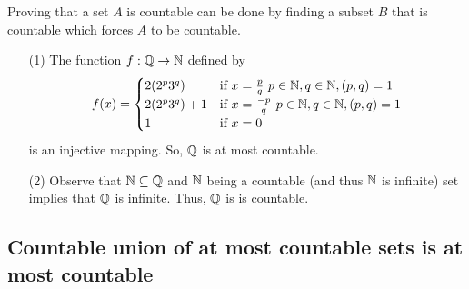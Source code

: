 \documentclass[a4paper]{report}
\begin{document}
Proving that a set \( A  \) is countable can be done by finding a subset \( B  \) that is countable which forces \( A  \) to be countable. 

\begin{eg}[\( \Q  \) is countable]
   \begin{enumerate}
       \item[(1)] The function \( f: \mathbb{Q} \to \mathbb{N} \) defined by 
           \[  f(x) = 
           \begin{cases}
               2(2^{p} 3^{q}) &\text{if} \ x = \frac{ p }{ q } \ p \in \mathbb{N}, q \in \mathbb{N}, (p,q) = 1 \\
               2(2^{p} 3^{q}) + 1 &\text{if} \ x = \frac{ -p }{ q } \ p \in \mathbb{N}, q \in \mathbb{N}, (p,q) = 1 \\
               1 &\text{if} \ x = 0
           \end{cases} \]
           is an injective mapping. So, \( \Q  \) is at most countable.
        \item[(2)] Observe that \( \mathbb{N} \subseteq \mathbb{Q}   \) and \( \mathbb{N}  \) being a countable (and thus \( \mathbb{N}  \) is infinite) set implies that \( \Q  \) is infinite. Thus, \( \Q  \) is is countable.
   \end{enumerate} 
\end{eg}

\subsection{Countable union of at most countable sets is at most countable}
\end{document}
